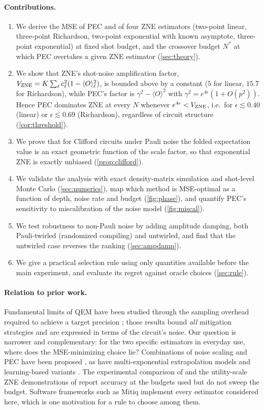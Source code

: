 \documentclass[11pt,a4paper]{article}
\theoremstyle{remark}
\newcommand{\eps}{\epsilon}
\begin{document}
\paragraph{Contributions.}
\begin{enumerate}
\item We derive the MSE of PEC and of four ZNE estimators (two-point linear, three-point Richardson, two-point exponential with known asymptote, three-point exponential) at fixed shot budget, and the crossover budget $N^*$ at which PEC overtakes a given ZNE estimator (\cref{sec:theory}).
\item We show that ZNE's shot-noise amplification factor, $V_{\rm ZNE}=K\sum_\ell c_\ell^2(1-\langle O\rangle_\ell^2)$, is bounded above by a constant ($5$ for linear, $15.7$ for Richardson), while PEC's factor is $\gamma^2-\langle O\rangle^2$ with $\gamma^2 = e^{4\eps}(1+O(p^2))$. Hence PEC dominates ZNE at every $N$ whenever $e^{4\eps}<V_{\rm ZNE}$, i.e.\ for $\eps\lesssim0.40$ (linear) or $\eps\lesssim0.69$ (Richardson), regardless of circuit structure (\cref{cor:threshold}).
\item We prove that for Clifford circuits under Pauli noise the folded expectation value is an exact geometric function of the scale factor, so that exponential ZNE is exactly unbiased (\cref{prop:clifford}).
\item We validate the analysis with exact density-matrix simulation and shot-level Monte Carlo (\cref{sec:numerics}), map which method is MSE-optimal as a function of depth, noise rate and budget (\cref{fig:phase}), and quantify PEC's sensitivity to miscalibration of the noise model (\cref{fig:miscal}).
\item We test robustness to non-Pauli noise by adding amplitude damping, both Pauli-twirled (randomized compiling) and untwirled, and find that the untwirled case reverses the ranking (\cref{sec:ampdamp}).
\item We give a practical selection rule using only quantities available before the main experiment, and evaluate its regret against oracle choices (\cref{sec:rule}).
\end{enumerate}

\paragraph{Relation to prior work.}
Fundamental limits of QEM have been studied through the sampling overhead required to achieve a target precision \cite{takagi2022,quek2022,tsubouchi2023}; those results bound \emph{all} mitigation strategies and are expressed in terms of the circuit's noise. Our question is narrower and complementary: for the two specific estimators in everyday use, where does the MSE-minimizing choice lie? Combinations of noise scaling and PEC have been proposed \cite{mari2021}, as have multi-exponential extrapolation models \cite{cai2021} and learning-based variants \cite{strikis2021,lowe2021}. The experimental comparison of \citet{vandenberg2023} and the utility-scale ZNE demonstrations of \citet{kim2023} report accuracy at the budgets used but do not sweep the budget. Software frameworks such as Mitiq \cite{larose2022} implement every estimator considered here, which is one motivation for a rule to choose among them.
\end{document}
